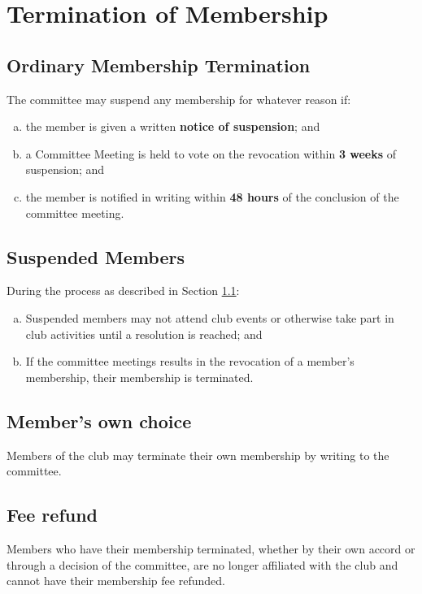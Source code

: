 \documentclass[11pt]{article}
\begin{document}
\section{Termination of Membership} \label{terminationMembership}
\subsection{Ordinary Membership Termination}\label{ordinaryMembershipTerimnation}
The committee may suspend any membership for whatever reason if:
\begin{enumerate}[(a)]
    \item the member is given a written \textbf{notice of suspension}; and
    \item a Committee Meeting is held to vote on the revocation within \textbf{3 weeks} of suspension; and
    \item the member is notified in writing within \textbf{48 hours} of the conclusion of the committee meeting.
\end{enumerate}

\subsection{Suspended Members}\label{suspendedMembers}
During the process as described in Section \ref{ordinaryMembershipTerimnation}:
\begin{enumerate}[(a)]
    \item Suspended members may not attend club events or otherwise take part in club activities until a resolution is reached; and
    \item If the committee meetings results in the revocation of a member’s membership, their membership is terminated.
\end{enumerate}

\subsection{Member's own choice}
Members of the club may terminate their own membership by writing to the committee.

\subsection{Fee refund}
Members who have their membership terminated, whether by their own accord or through a decision of the committee, are no longer affiliated with the club and cannot have their membership fee refunded.
\end{document}

